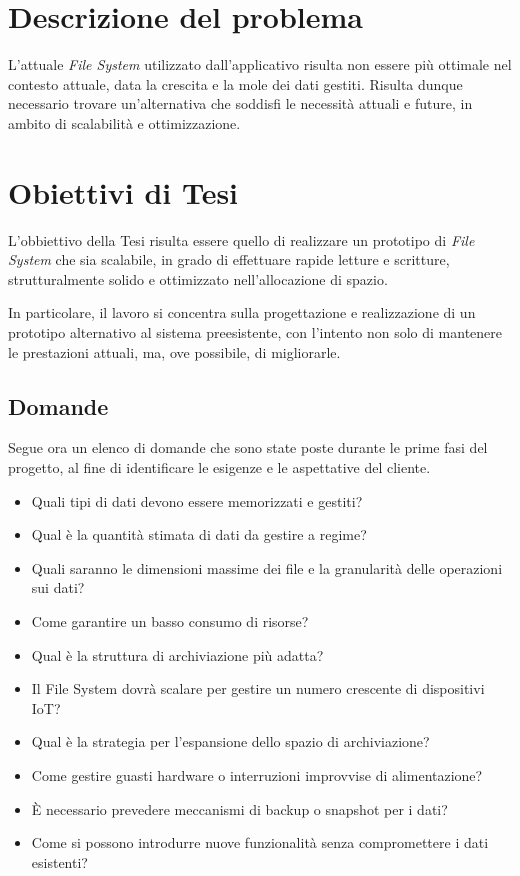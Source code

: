 \documentclass[12pt,a4paper,openright,twoside]{book}
\begin{document}
    \section{Descrizione del problema}

        L'attuale \textit{File System} utilizzato dall'applicativo risulta non essere più ottimale nel contesto attuale, data la crescita e la mole dei dati gestiti.
        Risulta dunque necessario trovare un'alternativa che soddisfi le necessità attuali e future, in ambito di scalabilità e ottimizzazione.

    \section{Obiettivi di Tesi}

        L'obbiettivo della Tesi risulta essere quello di realizzare un prototipo di \textit{File System} che sia scalabile, in grado di effettuare rapide letture e scritture, strutturalmente solido e ottimizzato nell'allocazione di spazio.

        In particolare, il lavoro si concentra sulla progettazione e realizzazione di un prototipo alternativo al sistema preesistente, con l'intento non solo di mantenere le prestazioni attuali, ma, ove possibile, di migliorarle.

        \subsection{Domande}
        \label{subsec:Domande}

            Segue ora un elenco di domande che sono state poste durante le prime fasi del progetto, al fine di identificare le esigenze e le aspettative del cliente.

            \begin{itemize}
                \item Quali tipi di dati devono essere memorizzati e gestiti?
                \item Qual è la quantità stimata di dati da gestire a regime?
                \item Quali saranno le dimensioni massime dei file e la granularità delle operazioni sui dati?
                \item Come garantire un basso consumo di risorse?
                \item Qual è la struttura di archiviazione più adatta?
                \item Il File System dovrà scalare per gestire un numero crescente di dispositivi IoT?
                \item Qual è la strategia per l'espansione dello spazio di archiviazione?
                \item Come gestire guasti hardware o interruzioni improvvise di alimentazione?
                \item È necessario prevedere meccanismi di backup o snapshot per i dati?
                \item Come si possono introdurre nuove funzionalità senza compromettere i dati esistenti?
            \end{itemize}
\end{document}
